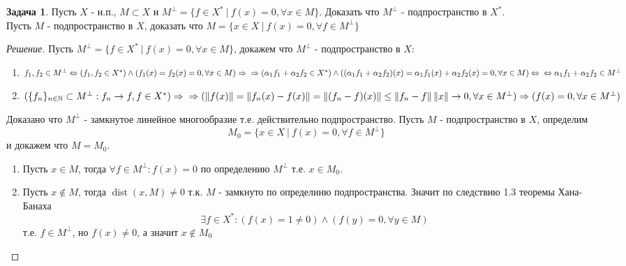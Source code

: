 \documentclass[12pt,a4paper]{article}
\theoremstyle{definition}
\newtheorem{exercise}{Задача}[section]
\newenvironment{solution}
{\renewcommand\qedsymbol{$\blacksquare$}\begin{proof}[Решение]}
{\end{proof}}
\newcommand{\Natural}{\mathbb{N}}
\newcommand{\norm}[1]{\left\lVert#1\right\rVert}
\newcommand{\setbuild}[2]{\{#1\:|\:#2\}}
\newcommand{\seq}[2]{\{#1\}_{#2}}
\DeclareMathOperator{\dist}{dist}
\begin{document}
	\begin{exercise}
		Пусть $X$ - н.п., $M \subset X$ и $M^\perp = \setbuild{f \in X^*}{f(x) = 0, \forall x \in M}$. Доказать что $M^\perp$ - подпространство в $X^*$. \\ Пусть $M$ - подпространство в $X$, доказать что $M = \setbuild{x\in X}{f(x) = 0, \forall f \in M^\perp}$
	\end{exercise}
	\begin{solution}
		Пусть $M^\perp = \setbuild{f \in X^*}{f(x) = 0, \forall x \in M}$, докажем что $M^\perp$ - подпространство в $X$:
		\begin{enumerate}
			\item $f_1, f_2 \in M^\perp \Leftrightarrow (f_1, f_2 \in X^*) \wedge (f_1 (x) = f_2 (x) = 0, \forall x \in M) \Rightarrow \\
			\Rightarrow (\alpha_1 f_1 + \alpha_2 f_2 \in X^*) \wedge ((\alpha_1 f_1 + \alpha_2 f_2 )(x) = \alpha_1 f_1 (x) + \alpha_2 f_2 (x) = 0, \forall x \in M) \Leftrightarrow \\
			\Leftrightarrow \alpha_1 f_1 + \alpha_2 f_2 \in M^\perp$
			
			\item $(\seq{f_n}{n\in \Natural} \subset M^\perp: f_n \to f, f\in X^*) \Rightarrow \\
			\Rightarrow (\norm{f(x)} = \norm{f_n(x) - f(x)} = \norm{(f_n - f)(x)} \leq \norm{f_n - f}\norm{x} \to 0, \\ \forall x \in M^\perp) \Rightarrow (f(x) = 0, \forall x \in M^\perp)$
		\end{enumerate}
		Доказано что $M^\perp$ - замкнутое линейное многообразие т.е. действительно подпространство.
		\newline \newline
		Пусть $M$ - подпространство в $X$, определим $$M_0 = \setbuild{x\in X}{f(x) = 0, \forall f \in M^\perp}$$
		и докажем что $M = M_0$. 
		\begin{enumerate}
			\item Пусть $x \in M$, тогда $\forall f \in M^\perp: f(x) = 0$ по определению $M^\perp$ т.е. $x \in M_0$. 
			\item Пусть $x \notin M$, тогда $\dist(x, M) \neq 0$ т.к. $M$ - замкнуто по определиню подпространства. Значит по следствию 1.3 теоремы Хана-Банаха 
			$$\exists f \in X^*: (f(x) = 1 \neq 0) \wedge (f(y) = 0, \forall y \in M)$$
			т.е. $f \in M^\perp$, но $f(x) \neq 0$, а значит $x \notin M_0$
		\end{enumerate}
	\end{solution}

	\newpage
	
\end{document}
